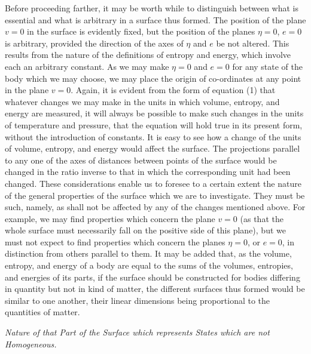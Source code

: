 \documentclass[11pt]{article}
\begin{document}
Before proceeding farther, it may be worth while to distinguish between what is essential and what is arbitrary in a surface thus formed. The position of the plane $v=0$ in the surface is evidently fixed, but the position of the planes $\eta=0$, $e=0$ is arbitrary, provided the direction of the axes of $\eta$ and $e$ be not altered. This results from the nature of the definitions of entropy and energy, which involve each an arbitrary constant. As we may make $\eta=0$ and $e=0$ for any state of the body which we may choose, we may place the origin of co-ordinates at any point in the plane $v=0$. Again, it is evident from the form of equation (1) that whatever changes we may make in the units in which volume, entropy, and energy are measured, it will always be possible to make such changes in the units of temperature and pressure, that the equation will hold true in its present form, without the introduction of constants. It is easy to see how a change of the units of volume, entropy, and energy would affect the surface. The projections parallel to any one of the axes of distances between points of the surface would be changed in the ratio inverse to that in which the corresponding unit had been changed. These considerations enable us to foresee to a certain extent the nature of the general properties of the surface which we are to investigate. They must be such, namely, as shall not be affected by any of the changes mentioned above. For example, we may find properties which concern the plane $v=0$ (as that the whole surface must necessarily fall on the positive side of this plane), but we must not expect to find properties which concern the planes $\eta=0$, or $e=0$, in distinction from others parallel to them. It may be added that, as the volume, entropy, and energy of a body are equal to the sums of the volumes, entropies, and energies of its parts, if the surface should be constructed for bodies differing in quantity but not in kind of matter, the different surfaces thus formed would be similar to one another, their linear dimensions being proportional to the quantities of matter.

\begin{center}
\itshape Nature of that Part of the Surface which represents States which are not Homogeneous.
\end{center}
\end{document}
